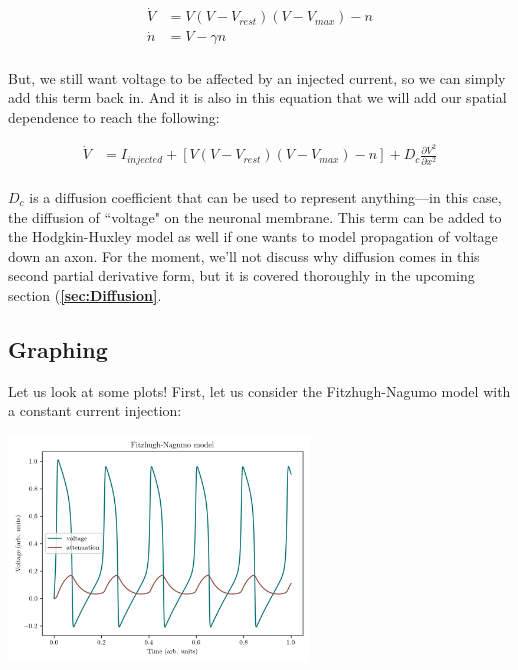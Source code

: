 \begin{equation} \label{fn4}
\begin{split}
    \dot{V} &= V(V - V_{rest})(V - V_{max}) - n\\ 
    \dot{n} &= V - \gamma n\\
\end{split}
\end{equation}

But, we still want voltage to be affected by an injected current, so we can simply add this term back in. And it is also in this equation that we will add our spatial dependence to reach the following: 

\begin{equation} \label{fn5}
\begin{split}
    \dot{V} &= I_{injected} + [V(V - V_{rest})(V - V_{max}) - n] +  D_c\frac{\partial V^2}{\partial x^2}\\
\end{split}
\end{equation}

$D_c$ is a diffusion coefficient that can be used to represent anything---in this case, the diffusion of ``voltage" on the neuronal membrane. This term can be added to the Hodgkin-Huxley model as well if one wants to model propagation of voltage down an axon. For the moment, we'll not discuss why diffusion comes in this second partial derivative form, but it is covered thoroughly in the upcoming section (\textbf{\ref{sec:Diffusion}}.\newline

\subsection{Graphing}

Let us look at some plots! First, let us consider the Fitzhugh-Nagumo model with a constant current injection:

\begin{center}
\includegraphics[width=0.6\textwidth]{images/models/fhn1.png}
\end{center}

